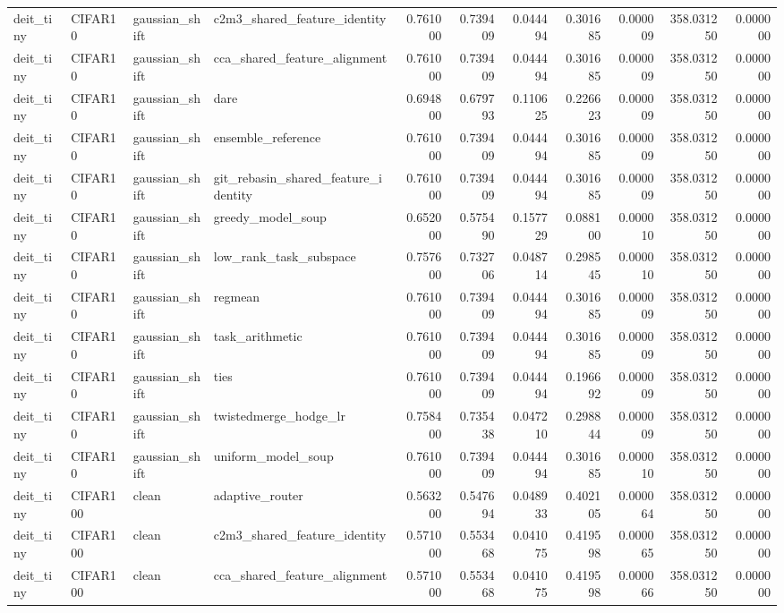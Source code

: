 \begin{tabular}{llllrrrrrrr}
deit_tiny & CIFAR10 & gaussian_shift & c2m3_shared_feature_identity & 0.761000 & 0.739409 & 0.044494 & 0.301685 & 0.000009 & 358.031250 & 0.000000 \\
deit_tiny & CIFAR10 & gaussian_shift & cca_shared_feature_alignment & 0.761000 & 0.739409 & 0.044494 & 0.301685 & 0.000009 & 358.031250 & 0.000000 \\
deit_tiny & CIFAR10 & gaussian_shift & dare & 0.694800 & 0.679793 & 0.110625 & 0.226623 & 0.000009 & 358.031250 & 0.000000 \\
deit_tiny & CIFAR10 & gaussian_shift & ensemble_reference & 0.761000 & 0.739409 & 0.044494 & 0.301685 & 0.000009 & 358.031250 & 0.000000 \\
deit_tiny & CIFAR10 & gaussian_shift & git_rebasin_shared_feature_identity & 0.761000 & 0.739409 & 0.044494 & 0.301685 & 0.000009 & 358.031250 & 0.000000 \\
deit_tiny & CIFAR10 & gaussian_shift & greedy_model_soup & 0.652000 & 0.575490 & 0.157729 & 0.088100 & 0.000010 & 358.031250 & 0.000000 \\
deit_tiny & CIFAR10 & gaussian_shift & low_rank_task_subspace & 0.757600 & 0.732706 & 0.048714 & 0.298545 & 0.000010 & 358.031250 & 0.000000 \\
deit_tiny & CIFAR10 & gaussian_shift & regmean & 0.761000 & 0.739409 & 0.044494 & 0.301685 & 0.000009 & 358.031250 & 0.000000 \\
deit_tiny & CIFAR10 & gaussian_shift & task_arithmetic & 0.761000 & 0.739409 & 0.044494 & 0.301685 & 0.000009 & 358.031250 & 0.000000 \\
deit_tiny & CIFAR10 & gaussian_shift & ties & 0.761000 & 0.739409 & 0.044494 & 0.196692 & 0.000009 & 358.031250 & 0.000000 \\
deit_tiny & CIFAR10 & gaussian_shift & twistedmerge_hodge_lr & 0.758400 & 0.735438 & 0.047210 & 0.298844 & 0.000009 & 358.031250 & 0.000000 \\
deit_tiny & CIFAR10 & gaussian_shift & uniform_model_soup & 0.761000 & 0.739409 & 0.044494 & 0.301685 & 0.000010 & 358.031250 & 0.000000 \\
deit_tiny & CIFAR100 & clean & adaptive_router & 0.563200 & 0.547694 & 0.048933 & 0.402105 & 0.000064 & 358.031250 & 0.000000 \\
deit_tiny & CIFAR100 & clean & c2m3_shared_feature_identity & 0.571000 & 0.553468 & 0.041075 & 0.419598 & 0.000065 & 358.031250 & 0.000000 \\
deit_tiny & CIFAR100 & clean & cca_shared_feature_alignment & 0.571000 & 0.553468 & 0.041075 & 0.419598 & 0.000066 & 358.031250 & 0.000000 \\

\end{tabular}
